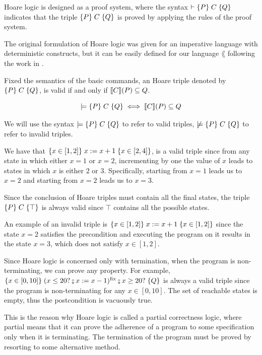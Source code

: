 \documentclass[
  10pt,       %
  twoside,    %
  a4paper,    %
  english,    %
  tikz,       %
  openright,  %
]{book}
\begin{document}
Hoare logic is designed as a proof system, where the syntax 
$\vdash \{ P \} \; C \; \{ Q \}$ indicates that the triple 
$\{ P \} \; C \; \{ Q \}$ is proved by applying the rules of the proof system.

The original formulation of Hoare logic was given for an imperative language 
with deterministic constructs, but it can be easily defined for our language 
$\lang$ following the work in \cite{Moller21}.

\begin{definition}
  \label{def:hoare}
  Fixed the semantics of the basic commands, an Hoare triple denoted by 
  $\{ P \} \; C \; \{ Q \}$, is valid if and only if $\llbracket C \rrbracket(P) \subseteq Q$.

  $$\models \{ P \} \; C \; \{ Q \} \iff \llbracket C \rrbracket(P) \subseteq Q$$
\end{definition}

We will use the syntax $\models \{ P \} \; C \; \{ Q \}$ to refer to valid triples,
$\not \models \{ P \} \; C \; \{ Q \}$ to refer to invalid triples.

\begin{example}
  \label{exmp:hlogic}
We have that $\{ x \in [1, 2] \} \; x := x + 1 \; \{ x \in [2, 4] \}$, is a
valid triple since from any state in which either $x = 1$ or $x = 2$,
incrementing by one the value of $x$ leads to states in which $x$ is either $2$
or $3$. Specifically, starting from $x = 1$ leads us to $x = 2$ and starting
from $x = 2$ leads us to $x = 3$.

Since the conclusion of Hoare triples must contain all the final states, the
triple $\{ P \} \; C \; \{ \top \}$ is always valid since $\top$ contains all the
possible states.

An example of an invalid triple is $\{ x \in [1, 2] \} \; x := x
+ 1 \; \{ x \in [1, 2] \}$ since the state $x = 2$ satisfies the precondition and
executing the program on it results in the state $x = 3$, which does not satisfy
$x \in [1, 2]$.

Since Hoare logic is concerned only with termination, when the program is
non-terminating, we can prove any property. For example, $\htriple{x
\in [0, 10]}{(x \leq 20? \fcmp x := x - 1)^\fix \fcmp x \geq 20?}{Q}$ is always
a valid triple since the program is non-terminating for any $x \in [0, 10]$. 
The set of reachable states is empty, thus the postcondition is vacuously true.

This is the reason why Hoare logic is called a partial correctness logic,
where partial means that it can prove the adherence of a program to
some specification only when it is terminating. The termination of the program
must be proved by resorting to some alternative method.
\end{example}
\end{document}
